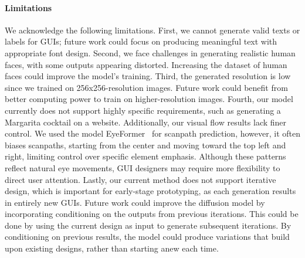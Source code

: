 \paragraph{Limitations} 

We acknowledge the following limitations. First, we cannot generate valid texts or labels for GUIs; future work could focus on producing meaningful text with appropriate font design. Second, we face challenges in generating realistic human faces, with some outputs appearing distorted. Increasing the dataset of human faces could improve the model's training. Third, the generated resolution is low since we trained on 256x256-resolution images. Future work could benefit from better computing power to train on higher-resolution images. Fourth, our model currently does not support highly specific requirements, such as generating a Margarita cocktail on a website. Additionally, our visual flow results lack finer control. We used the model EyeFormer~\cite{eyeformer} for scanpath prediction, however, it often biases scanpaths, starting from the center and moving toward the top left and right, limiting control over specific element emphasis. Although these patterns reflect natural eye movements, GUI designers may require more flexibility to direct user attention. Lastly, our current method does not support iterative design, which is important for early-stage prototyping, as each generation results in entirely new GUIs. Future work could improve the diffusion model by incorporating conditioning on the outputs from previous iterations. This could be done by using the current design as input to generate subsequent iterations. By conditioning on previous results, the model could produce variations that build upon existing designs, rather than starting anew each time.







